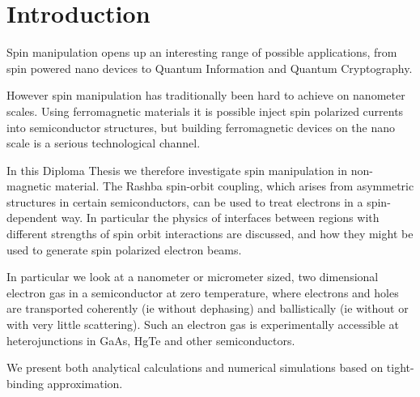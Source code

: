 \chapter{Introduction}

Spin manipulation opens up an interesting range of possible applications, from
spin powered nano devices to Quantum Information and Quantum Cryptography.

However spin manipulation has traditionally been hard to achieve on nanometer
scales. Using ferromagnetic materials it is possible inject spin polarized
currents into semiconductor structures, but building ferromagnetic devices on
the nano scale is a serious technological channel.

In this Diploma Thesis we therefore investigate spin manipulation in
non-magnetic material. The Rashba spin-orbit coupling, which arises from
asymmetric structures in certain semiconductors, can be used to treat
electrons in a spin-dependent way. In particular the physics of interfaces
between regions with different strengths of spin orbit interactions are
discussed, and how they might be used to generate spin polarized electron
beams.

In particular we look at a nanometer or micrometer sized, two dimensional
electron gas in a semiconductor at zero temperature, where electrons and holes
are transported coherently (ie without dephasing) and ballistically (ie
without or with very little scattering). Such an electron gas is
experimentally accessible at heterojunctions in GaAs, HgTe and other semiconductors.

We present both analytical calculations and numerical simulations based on
tight-binding approximation.
